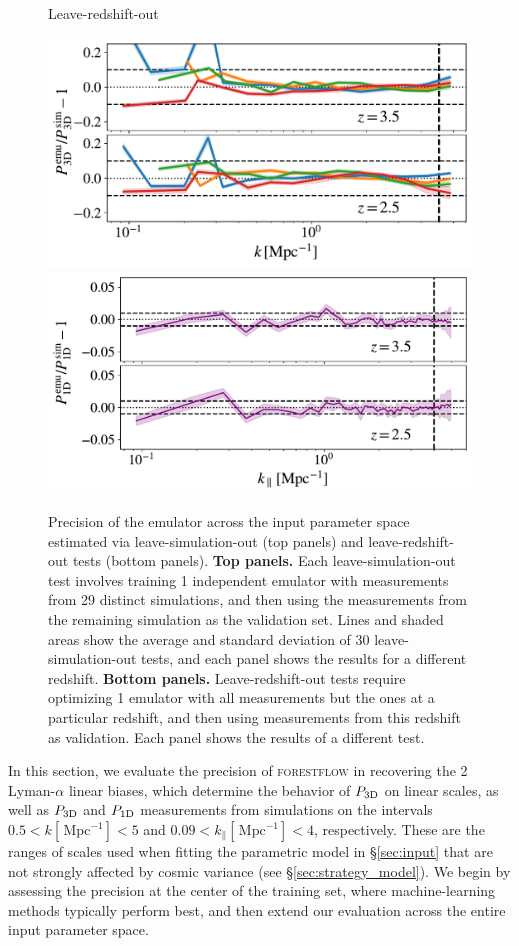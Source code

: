 \documentclass{aa}
\newcommand{\poned}{\ensuremath{P_{\rm 1D}}\xspace}
\newcommand{\pthreed}{\ensuremath{P_{\rm 3D}}\xspace}
\newcommand{\forestflow}{\textsc{forestflow}\xspace}
\newcommand{\iMpc}{\ensuremath{\,\mathrm{Mpc}^{-1}}}
\begin{document}
\begin{figure}
\Large{Leave-redshift-out}\par\medskip
\includegraphics[width= 0.95\columnwidth]{figures/l1O_z_P3D.pdf}
\includegraphics[width= 0.96\columnwidth]{figures/l1O_z_P1D.pdf}
\caption{Precision of the emulator across the input parameter space estimated via leave-simulation-out (top panels) and leave-redshift-out tests (bottom panels). {\bf Top panels.} Each leave-simulation-out test involves training 1 independent emulator with measurements from 29 distinct simulations, and then using the measurements from the remaining simulation as the validation set. Lines and shaded areas show the average and standard deviation of 30 leave-simulation-out tests, and each panel shows the results for a different redshift. {\bf Bottom panels.} Leave-redshift-out tests require optimizing 1 emulator with all measurements but the ones at a particular redshift, and then using measurements from this redshift as validation. Each panel shows the results of a different test.
}
\label{fig:leave_sim_out}
\end{figure}

In this section, we evaluate the precision of \forestflow in recovering the 2 Lyman-$\alpha$ linear biases, which determine the behavior of \pthreed on linear scales, as well as \pthreed and \poned measurements from simulations on the intervals $0.5<k[\iMpc]<5$ and $0.09<k_\parallel[\iMpc]<4$, respectively. These are the ranges of scales used when fitting the parametric model in \S\ref{sec:input} that are not strongly affected by cosmic variance (see \S\ref{sec:strategy_model}). We begin by assessing the precision at the center of the training set, where machine-learning methods typically perform best, and then extend our evaluation across the entire input parameter space.
\end{document}
